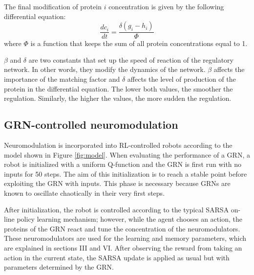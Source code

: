 \documentclass[conference]{IEEEtran}
\begin{document}
The final modification of protein $i$ concentration is given by the following
differential equation:
\begin{equation}
\frac{dc_i}{dt}=\frac{\delta(g_i-h_i)}{\Phi}
\end{equation}
where $\Phi$ is a function that keeps the sum of all protein concentrations
equal to 1.

$\beta$ and $\delta$ are two constants that set up the speed of reaction of the
regulatory network. In other words, they modify the dynamics of the network. $\beta$
affects the importance of the matching factor and $\delta$ affects the level of
production of the protein in the differential equation. The lower both values,
the smoother the regulation. Similarly, the higher the values, the more sudden
the regulation. 



\subsection{GRN-controlled neuromodulation}

Neuromodulation is incorporated into RL-controlled robots according to the model
shown in Figure \ref{fig:model}.
When evaluating the performance of a GRN, a robot is initialized with a uniform
Q-function and the GRN is first run with no inputs for 50 steps. The aim of this
initialization is to reach a stable point before exploiting the GRN with inputs.
This phase is necessary because GRNs are known to oscillate chaotically in their
very first steps.

After initialization, the robot is controlled according to the typical SARSA on-line policy learning mechanism;
however, while the agent chooses an action, the proteins of the GRN react and
tune the concentration of the neuromodulators. These neuromodulators are used
for the learning and memory parameters, which are explained in sections III and VI. After
observing the reward from taking an action in the current state, the SARSA
update is applied as usual but with parameters determined by the GRN.
\end{document}
